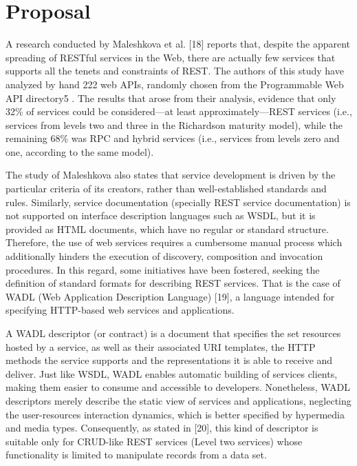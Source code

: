 \section{Proposal}

\noindent A research conducted by Maleshkova et al. [18] reports that, despite the apparent spreading of RESTful services in the Web, there are actually few services that supports all the tenets and constraints of REST. The authors of this study have analyzed by hand 222 web APIs, randomly chosen from the Programmable Web API directory5 . The results that arose from their analysis, evidence that only 32\% of services could be considered—at least approximately—REST services (i.e., services from levels two and three in the Richardson maturity model), while the remaining 68\% was RPC and hybrid services (i.e., services from levels zero and one, according to the same model).

The study of Maleshkova also states that service development is driven by the particular criteria of its creators, rather than well-established standards and rules. Similarly, service documentation (specially REST service documentation) is not supported on interface description languages such as WSDL, but it is provided as HTML documents, which have no regular or standard structure. Therefore, the use of web services requires a cumbersome manual process which additionally hinders the execution of discovery, composition and invocation procedures. In this regard, some initiatives have been fostered, seeking the definition of standard formats for describing REST services. That is the case of WADL (Web Application Description Language) [19], a language intended for specifying HTTP-based web services and applications.

A WADL descriptor (or contract) is a document that specifies the set resources hosted by a service, as well as their associated URI templates, the HTTP methods the service supports and the representations it is able to receive and deliver. Just like WSDL, WADL enables automatic building of services clients, making them easier to consume and accessible to developers. Nonetheless, WADL descriptors merely describe the static view of services and applications, neglecting the user-resources interaction dynamics, which is better specified by hypermedia and media types. Consequently, as stated in [20], this kind of descriptor is suitable only for CRUD-like REST services (Level two services) whose functionality is limited to manipulate records from a data set.


